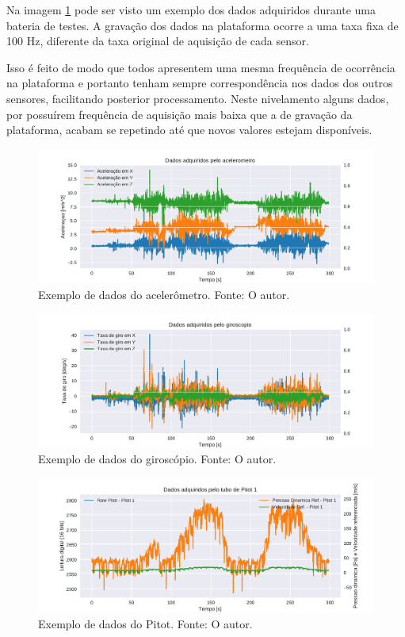 Na imagem \ref{fig:raw_accel_plots} pode ser visto um exemplo dos dados adquiridos durante uma bateria de testes. A gravação dos dados na plataforma ocorre a uma taxa fixa de 100 Hz, diferente da taxa original de aquisição de cada sensor. 

Isso é feito de modo que todos apresentem uma mesma frequência de ocorrência na plataforma e portanto tenham sempre correspondência nos dados dos outros sensores, facilitando posterior processamento. Neste nivelamento alguns dados, por possuírem frequência de aquisição mais baixa que a de gravação da plataforma, acabam se repetindo até que novos valores estejam disponíveis.

\begin{figure}[!ht]
    \centering
    \includegraphics[width=.8\linewidth]{plots/accel_plots.pdf}
    \caption{Exemplo de dados do acelerômetro. Fonte: O autor.}
    \label{fig:raw_accel_plots}
\end{figure}

\begin{figure}[!ht]
    \centering
    \includegraphics[width=.8\linewidth]{plots/gyro_plots.pdf}
    \caption{Exemplo de dados do giroscópio. Fonte: O autor.}
    \label{fig:raw_gyro_plots}
\end{figure}

\begin{figure}[!ht]
    \centering
    \includegraphics[width=.8\linewidth]{plots/pitot_plots.pdf}
    \caption{Exemplo de dados do Pitot. Fonte: O autor.}
    \label{fig:raw_pitot_plots}
\end{figure}


